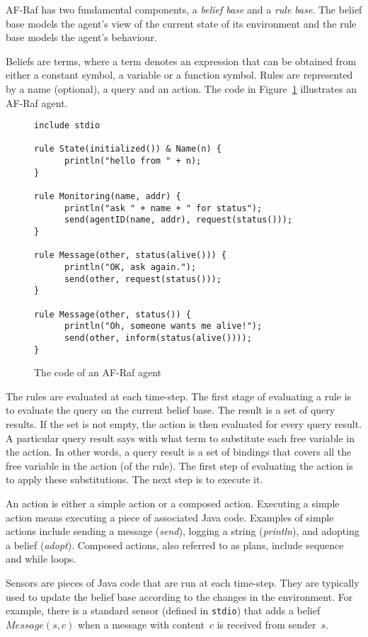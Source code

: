 \documentclass[a4paper,12pt,oneside,fleqn]{book} %
\theoremstyle{plain}
\theoremstyle{definition}
\theoremstyle{remark}
\newcommand{\rg}[1]{\marginpar{\tiny\raggedright\textcolor{blue}{\bf rg:} #1}}
\begin{document}
AF-Raf has two fundamental components, a \textit{belief base}
and a \textit{rule base}. The belief base models the agent's view of the
current state of its environment and the rule base models the agent's
behaviour.

Beliefs are terms, where a term denotes an expression that can be obtained from
either a constant symbol, a variable or a function symbol. Rules are
represented by a name (optional), a query and an action.  The code in
Figure~\ref{fig:AF-Raf} illustrates an AF-Raf agent.

\begin{figure}\footnotesize %
\begin{verbatim}
include stdio

rule State(initialized()) & Name(n) {
      println("hello from " + n);
}

rule Monitoring(name, addr) {
      println("ask " + name + " for status");
      send(agentID(name, addr), request(status()));
}

rule Message(other, status(alive())) {
      println("OK, ask again.");
      send(other, request(status()));
}

rule Message(other, status()) {
      println("Oh, someone wants me alive!");
      send(other, inform(status(alive())));
}
\end{verbatim}
\caption{The code of an AF-Raf agent}
\label{fig:AF-Raf}
\end{figure} %

The rules are evaluated at each time-step. The first stage of evaluating a
rule is to evaluate the query on the current belief base. The result is a
set of query results. \rg{A result is a set of results? Empty set is
special?} If the set is not empty, the action is then evaluated for every
query result. A particular query result says with what term to substitute
each free variable in the action. In other words, a query result is a set
of bindings that covers all the free variable in the action (of the rule).
The first step of evaluating the action is to apply these substitutions.
The next step is to execute it.

An action is either a simple action or a composed action. Executing a
simple action means executing a piece of associated Java code. Examples of
simple actions include sending a message (\textit{send}), logging a string
(\textit{println}), and adopting a belief (\textit{adopt}).  Composed
actions, also referred to as plans, include sequence and while loops.

Sensors are pieces of Java code that are run at each time-step. They are
typically used to update the belief base according to the changes in the
environment. For example, there is a standard sensor (defined in
\texttt{stdio}) that adds a belief $\mathit{Message}(s,c)$ when a message
with content~$c$ is received from sender~$s$. %
\end{document}
